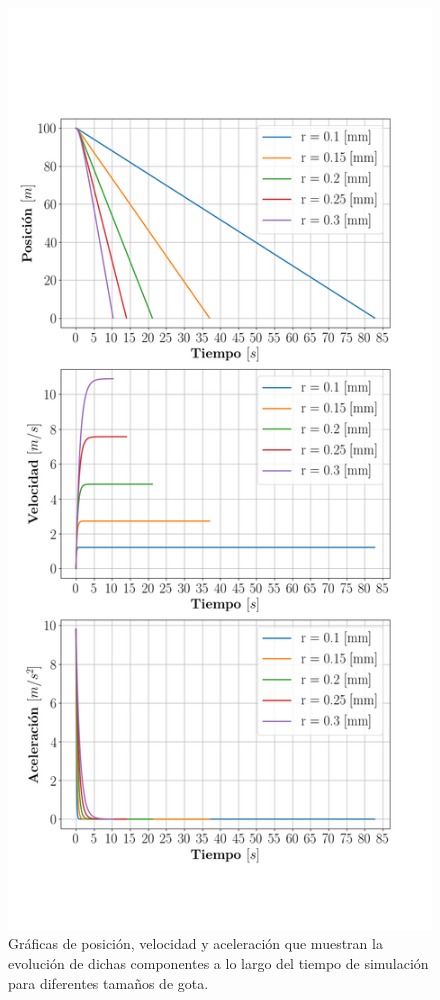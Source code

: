 \documentclass[journal]{IEEEtran}
\begin{document}
\begin{figure}[!htb]
	\centering
	\includegraphics[width=1.1\linewidth]{graficas_radio}
	\caption{Gráficas de posición, velocidad y aceleración que muestran la evolución de dichas componentes a lo largo del tiempo de simulación para diferentes tamaños de gota.}
\end{figure}
\end{document}
